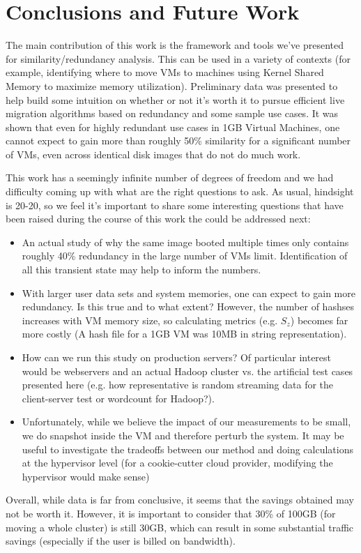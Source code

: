 \documentclass{acm_proc_article-sp}
\begin{document}
\section{Conclusions and Future Work}
The main contribution of this work is the framework and tools we've presented for similarity/redundancy analysis.  This can be used in a variety of contexts (for example, identifying where to move VMs to machines using Kernel Shared Memory to maximize memory utilization).  Preliminary data was presented to help build some intuition on whether or not it's worth it to pursue efficient live migration algorithms based on redundancy and some sample use cases.  It was shown that even for highly redundant use cases in 1GB Virtual Machines, one cannot expect to gain more than roughly 50\% similarity for a significant number of VMs, even across identical disk images that do not do much work.

This work has a seemingly infinite number of degrees of freedom and we had difficulty coming up with what are the right questions to ask.  As usual, hindsight is 20-20, so we feel it's important to share some interesting questions that have been raised during the course of this work the could be addressed next:
\begin{itemize}
  \item An actual study of why the same image booted multiple times only contains roughly 40\% redundancy in the large number of VMs limit.  Identification of all this transient state may help to inform the numbers.
  \item With larger user data sets and system memories, one can expect to gain more redundancy.  Is this true and to what extent?  However, the number of hashses increases with VM memory size, so calculating metrics (e.g. $S_z$) becomes far more costly (A hash file for a 1GB VM was 10MB in string representation).
  \item How can we run this study on production servers? Of particular interest would be webservers and an actual Hadoop cluster vs. the artificial test cases presented here (e.g. how representative is random streaming data for the client-server test or wordcount for Hadoop?).
  \item Unfortunately, while we believe the impact of our measurements to be small, we do snapshot inside the VM and therefore perturb the system.  It may be useful to investigate the tradeoffs between our method and doing calculations at the hypervisor level (for a cookie-cutter cloud provider, modifying the hypervisor would make sense)
\end{itemize}

Overall, while data is far from conclusive, it seems that the savings obtained may not be worth it.  However, it is important to consider that 30\% of 100GB (for moving a whole cluster) is still 30GB, which can result in some substantial traffic savings (especially if the user is billed on bandwidth). 




\end{document}

